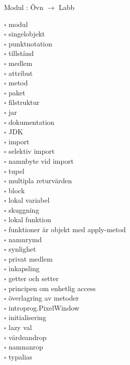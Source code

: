 
    Modul : Övn  $\rightarrow$ Labb 
    \begin{multicols}{3}\SlideFontTiny
    $\square$ modul \\
$\square$ singelobjekt \\
$\square$ punktnotation \\
$\square$ tillstånd \\
$\square$ medlem \\
$\square$ attribut \\
$\square$ metod \\
$\square$ paket \\
$\square$ filstruktur \\
$\square$ jar \\
$\square$ dokumentation \\
$\square$ JDK \\
$\square$ import \\
$\square$ selektiv import \\
$\square$ namnbyte vid import \\
$\square$ tupel \\
$\square$ multipla returvärden \\
$\square$ block \\
$\square$ lokal variabel \\
$\square$ skuggning \\
$\square$ lokal funktion \\
$\square$ funktioner är objekt med apply-metod \\
$\square$ namnrymd \\
$\square$ synlighet \\
$\square$ privat medlem \\
$\square$ inkapsling \\
$\square$ getter och setter \\
$\square$ principen om enhetlig access \\
$\square$ överlagring av metoder \\
$\square$ introprog.PixelWindow \\
$\square$ initialisering \\
$\square$ lazy val \\
$\square$ värdeandrop \\
$\square$ namnanrop \\
$\square$ typalias \\
    \end{multicols}
    